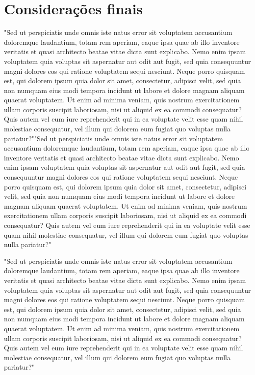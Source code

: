 \documentclass[
	oneside,
	12pt,				%
	a4paper,			%
	english,			%
	brazil,				%
	article
	]{abntex2}
\begin{document}
\section{Considerações finais}

"Sed ut  perspiciatis unde omnis iste natus error sit voluptatem accusantium doloremque laudantium, totam rem aperiam, eaque ipsa quae ab illo inventore veritatis et quasi architecto beatae vitae dicta sunt explicabo. Nemo enim ipsam voluptatem quia voluptas sit aspernatur aut odit aut fugit, sed quia consequuntur magni dolores eos qui ratione voluptatem sequi nesciunt. Neque porro quisquam est, qui dolorem ipsum quia dolor sit amet, consectetur, adipisci velit, sed quia non numquam eius modi tempora incidunt ut labore et dolore magnam aliquam quaerat voluptatem. Ut enim ad minima veniam, quis nostrum exercitationem ullam corporis suscipit laboriosam, nisi ut aliquid ex ea commodi consequatur? Quis autem vel eum iure reprehenderit qui in ea voluptate velit esse quam nihil molestiae consequatur, vel illum qui dolorem eum fugiat quo voluptas nulla pariatur?""Sed ut perspiciatis unde omnis iste natus error sit voluptatem accusantium doloremque laudantium, totam rem aperiam, eaque ipsa quae ab illo inventore veritatis et quasi architecto beatae vitae dicta sunt explicabo. Nemo enim ipsam voluptatem quia voluptas sit aspernatur aut odit aut fugit, sed quia consequuntur magni dolores eos qui ratione voluptatem sequi nesciunt. Neque porro quisquam est, qui dolorem ipsum quia dolor sit amet, consectetur, adipisci velit, sed quia non numquam eius modi tempora incidunt ut labore et dolore magnam aliquam quaerat voluptatem. Ut enim ad minima veniam, quis nostrum exercitationem ullam corporis suscipit laboriosam, nisi ut aliquid ex ea commodi consequatur? Quis autem vel eum iure reprehenderit qui in ea voluptate velit esse quam nihil molestiae consequatur, vel illum qui dolorem eum fugiat quo voluptas nulla pariatur?"

"Sed ut perspiciatis unde omnis iste natus error sit voluptatem accusantium doloremque laudantium, totam rem aperiam, eaque ipsa quae ab illo inventore veritatis et quasi architecto beatae vitae dicta sunt explicabo. Nemo enim ipsam voluptatem quia voluptas sit aspernatur aut odit aut fugit, sed quia consequuntur magni dolores eos qui ratione voluptatem sequi nesciunt. Neque porro quisquam est, qui dolorem ipsum quia dolor sit amet, consectetur, adipisci velit, sed quia non numquam eius modi tempora incidunt ut labore et dolore magnam aliquam quaerat voluptatem. Ut enim ad minima veniam, quis nostrum exercitationem ullam corporis suscipit laboriosam, nisi ut aliquid ex ea commodi consequatur? Quis autem vel eum iure reprehenderit qui in ea voluptate velit esse quam nihil molestiae consequatur, vel illum qui dolorem eum fugiat quo voluptas nulla pariatur?"



\end{document}

